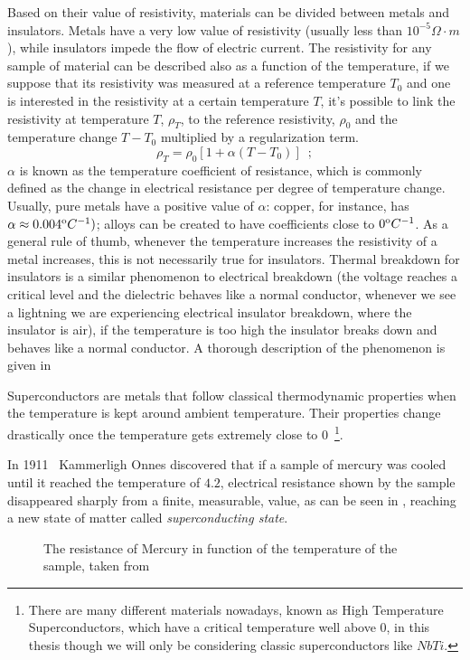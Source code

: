 Based on their value of resistivity, materials can be divided between metals and insulators. Metals
have a very low value of resistivity (usually less than $10^{-5}\Omega\cdot m$), while insulators impede the
flow of electric current. The resistivity for any sample of material can be described also as a
function of the temperature, if we suppose that its resistivity was measured at a reference
temperature $T_0$ and one is interested in the resistivity at a certain temperature $T$, it's
possible to link the resistivity at temperature $T$, $\rho_T$, to the reference resistivity,
$\rho_0$ and the temperature change $T - T_0$ multiplied by a regularization term.
\begin{equation}
	\label{eq:resistivity-func-of-temp}
	\rho_T = \rho_0[1 + \alpha(T - T_0)] \enspace;
\end{equation}
$\alpha$ is known as the temperature coefficient of resistance, which is commonly defined as the
change in electrical resistance per degree of temperature change. Usually, pure metals have a
positive value of $\alpha$: copper, for instance, has $\alpha \approx 0.004^\text{o}C^{-1})$; alloys can be
created to have coefficients close to $0^\text{o}C^{-1}$. As a general rule of thumb, whenever the
temperature increases the resistivity of a metal increases, this is not necessarily
true for insulators. Thermal breakdown for insulators is a similar phenomenon to electrical
breakdown (the voltage reaches a critical level and the dielectric behaves like a normal conductor,
whenever we see a lightning we are experiencing electrical insulator breakdown, where the insulator
is air), if the temperature is too high the insulator breaks down and behaves like a normal conductor. A thorough description of the phenomenon is given in~\cite{kuvyrkin2022}

Superconductors are metals that follow classical thermodynamic properties when the temperature is
kept around ambient temperature. Their properties change drastically once the temperature gets
extremely close to $0$\K~\footnote{
	There are many different materials nowadays, known as High Temperature
	Superconductors, which have a critical temperature well above $0$\K, in this thesis though we will
	only be considering classic superconductors like $NbTi$.
}.

In 1911~\cite{invention-superconductivity} Kammerligh Onnes discovered that if a sample of mercury was cooled
until it reached the temperature of $4.2$\K, electrical resistance shown by the sample disappeared
sharply from a finite, measurable, value, as can be seen in , reaching
a new state of matter called \emph{superconducting state}.
\begin{figure}[!ht]
	\centering
	
	\caption{The resistance of Mercury in function of the temperature of the sample, taken from~\cite{tsukerman2020compendium}}
	\label{img:mercury-resistance}
\end{figure}

